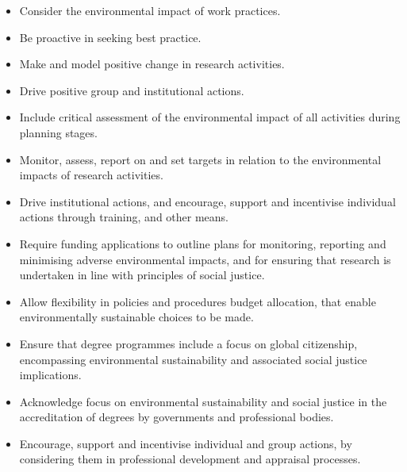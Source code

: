 \documentclass[../SustainableHEP.tex]{subfiles}
\begin{document}

\clearpage
\begin{minipage}{\textwidth}
\begin{reco2}{\currentname}
{
\begin{itemize}[leftmargin=6 mm]
\item Consider the environmental impact of work practices.

\item Be proactive in seeking best practice.

\item Make and model positive change in research activities.

\item Drive positive group and institutional actions.
\end{itemize}
}
{
\begin{itemize}[leftmargin=6 mm]
\item  Include critical assessment of the environmental impact of all activities during planning stages.

\item  Monitor, assess, report on and set targets in relation to the environmental impacts of research activities.

\item Drive institutional actions, and encourage, support and incentivise individual actions through training, and other means.

\end{itemize}
}
{
\begin{itemize}[leftmargin=6 mm]

\item Require funding applications to outline plans for monitoring, reporting and minimising adverse environmental impacts, and for ensuring that research is undertaken in line with principles of social justice.

\item Allow flexibility in policies and procedures \eg budget allocation, that enable environmentally sustainable choices to be made.

\item Ensure that degree programmes include a focus on global citizenship, encompassing environmental sustainability and associated social justice implications.

\item Acknowledge focus on environmental sustainability and social justice in the accreditation of degrees by governments and professional bodies.

\item Encourage, support and incentivise individual and group actions, \eg by considering them in professional development and appraisal processes.

\end{itemize}
}

\end{reco2}
\end{minipage}
\end{document}
